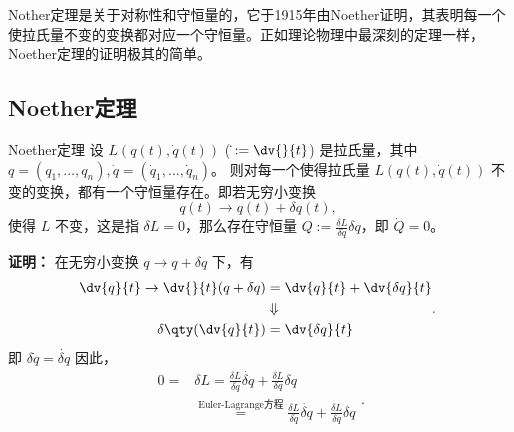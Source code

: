 
Nother定理是关于对称性和守恒量的，它于1915年由Noether证明，其表明每一个使拉氏量不变的变换都对应一个守恒量。正如理论物理中最深刻的定理一样，Noether定理的证明极其的简单。

\subsection{Noether定理}
\begin{theorem}{Noether定理}
设 $L(q(t),\dot q(t))$ ($\dot{}:=\dv{}{t}$) 是拉氏量，其中 $q=(q_1,\ldots,q_n),\dot q=(\dot q_1,\ldots,\dot q_n)$。 则对每一个使得拉氏量 $L(q(t),\dot q(t))$ 不变的变换，都有一个守恒量存在。即若无穷小变换
\begin{equation}
q(t)\rightarrow q(t)+\delta q(t),~
\end{equation}
使得 $L$ 不变，这是指 $\delta L=0$，那么存在守恒量 $Q:=\frac{\delta L}{\delta\dot q}\delta q$，即 $\dot Q=0$。
\end{theorem}
\textbf{证明：}
在无穷小变换 $q\rightarrow q+\delta q$ 下，有
\begin{equation}
\begin{aligned}
\dv{q}{t}\rightarrow\dv{}{t}(q+\delta q)&=\dv{q}{t}+\dv{\delta q}{t}\\
&\Downarrow\\
\delta\qty(\dv{q}{t})&=\dv{\delta q}{t}
\end{aligned}.~
\end{equation}
即 $\delta \dot q=\dot{\delta q}$
因此，
\begin{equation}
\begin{aligned}
0=&\delta L=\frac{\delta L}{\delta \dot q}\dot{\delta q}+\frac{\delta L}{\delta q}\delta q\\
&\overset{\text{Euler-Lagrange方程}}{=}\frac{\delta L}{\delta \dot q}\dot{\delta q}+\frac{\delta L}{\delta q}\delta q\\
\end{aligned}.~
\end{equation}







